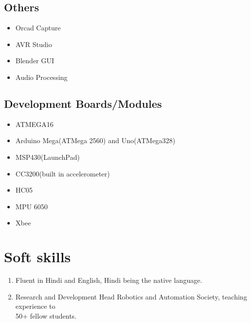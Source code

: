 \documentclass[11pt]{article}
\begin{document}
\begin{minipage}{1.5\linewidth}
\subsection{Others}
\begin{itemize}
\item Orcad Capture
\item AVR Studio
\item Blender GUI
\item Audio Processing
\end{itemize}
\end{minipage}

\begin{minipage}{1.5\linewidth}
\subsection{Development Boards/Modules}
\begin{itemize}
\item ATMEGA16
\item Arduino Mega(ATMega 2560) and Uno(ATMega328)
\item MSP430(LaunchPad)
\item CC3200(built in accelerometer)
\item HC05
\item MPU 6050
\item Xbee
\end{itemize}

\section{\color{orange}Sof\color{black}t skills}
\begin{enumerate}
\item Fluent in Hindi and English, Hindi being the native language.
\item Research and Development Head Robotics and Automation Society, teaching experience to \\50+ fellow students.

\end{enumerate}

\end{minipage}
\end{document}
